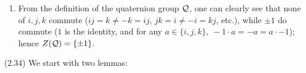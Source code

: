 \documentclass{homework}
\begin{document}
\begin{solution}
\begin{enumerate}[label=(\alph*)]
\begin{proof}[Proof]
        By definition, $e$ commutes with every element in $ \D_n$. Therefore, $Z(\D_n)=\{ e \}$ when
        $n$ is odd, and $Z(\D_n)=\{ e,r_{\frac{n}{2}} \}$ when $n$ is even.
      \end{proof}
      
    \item From the definition of the quaternion group $\mathcal{Q}$, one can clearly see that none of
      $i,j,k$ commute ($ij=k\neq -k=ij$, $jk=i\neq-i=kj$, etc.), while $\pm 1$ do commute ($1$ is
      the identity, and for any $a\in \{ i,j,k \},\ -1\cdot a=-a=a\cdot -1$); hence $Z(\mathcal{Q})=\{
      \pm 1 \}$.
      
  \end{enumerate}

  (2.34) We start with two lemmas:
\end{solution}
\end{document}
